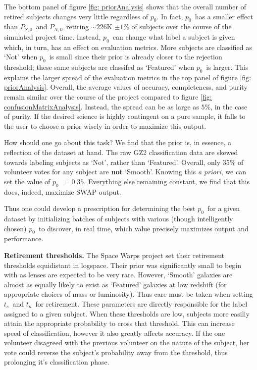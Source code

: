 \documentclass[twocolumn]{aastex6}
\newcommand{\Ps}{$P_{S,0}$}
\newcommand{\Pn}{$P_{N,0}$}
\newcommand{\p}{$p_0$}
\newcommand{\ts}{$t_s$}
\newcommand{\tn}{$t_n$}
\begin{document}
The bottom panel of figure \ref{fig: priorAnalysis} shows that the overall number
of retired subjects changes very little regardless of \p. In fact, \p~has a smaller effect 
than \Ps~and \Pn~retiring $\sim226$K $\pm1\%$ of subjects over the course of the 
simulated project time. Instead, \p~can change what label a subject is given which, 
in turn, has an effect on evaluation metrics. More subjects are classified as `Not' 
when \p~is small since their prior is already closer to the rejection threshold; 
these same subjects are classifed as `Featured' when \p~is larger.
This explains the larger spread of the evaluation metrics in the top panel of figure 
\ref{fig: priorAnalysis}.  Overall, the average values of accuracy, completeness, 
and purity remain similar over the course of the project compared to figure 
\ref{fig: confusionMatrixAnalysis}. Instead, the spread can 
be as large as $5\%$, in the case of purity. If the desired science is highly contingent
on a pure sample, it falls to the user to choose a prior wisely in order to maximize 
this output. 

How should one go about this task? We find that the prior is, in essence, a reflection
of the dataset at hand. The raw GZ2 classification data are skewed towards labeling 
subjects as `Not', rather than `Featured'. Overall, only 35\% of volunteer votes for 
any subject are \textbf{not} `Smooth'. Knowing this \textit{a priori}, we can set the 
value of \p~$= 0.35$. Everything else remaining constant, we find that this does, 
indeed, maximize SWAP output. 

Thus one could develop a prescription for determining the best \p~for a given dataset
by initializing batches of subjects with various (though intelligently chosen) \p~to 
discover, in real time, which value precisely maximizes output and performance. 


\textbf{Retirement thresholds.}
The Space Warps project set their retirement thresholds equidistant in logspace. 
Their prior was significantly small to begin with as lenses are expected to be very rare.
However, `Smooth' galaxies are almost as equally likely to exist 
as `Featured' galaxies at low redshift (for appropriate choices of mass or luminosity). 
Thus care must be taken when setting \ts~and \tn~for retirement. 
These parameters are directly responsible for the label assigned to a given subject. 
When these thresholds are low, subjects more easiliy attain the appropriate 
probability to cross that threshold. This can increase speed of classification, however
it also greatly affects accuracy. If the one volunteer disagreed with the previous 
volunteer on the nature of the subject, her vote could reverse the subject's probability
away from the threshold, thus prolonging it's classification phase.  
\end{document}
